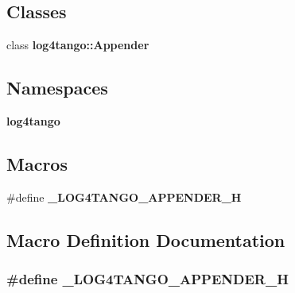 \subsection*{Classes}
\begin{DoxyCompactItemize}
\item 
class {\bf log4tango\-::\-Appender}
\end{DoxyCompactItemize}
\subsection*{Namespaces}
\begin{DoxyCompactItemize}
\item 
{\bf log4tango}
\end{DoxyCompactItemize}
\subsection*{Macros}
\begin{DoxyCompactItemize}
\item 
\#define {\bf \-\_\-\-L\-O\-G4\-T\-A\-N\-G\-O\-\_\-\-A\-P\-P\-E\-N\-D\-E\-R\-\_\-\-H}
\end{DoxyCompactItemize}


\subsection{Macro Definition Documentation}
\subsubsection[{\-\_\-\-L\-O\-G4\-T\-A\-N\-G\-O\-\_\-\-A\-P\-P\-E\-N\-D\-E\-R\-\_\-\-H}]{\setlength{\rightskip}{0pt plus 5cm}\#define \-\_\-\-L\-O\-G4\-T\-A\-N\-G\-O\-\_\-\-A\-P\-P\-E\-N\-D\-E\-R\-\_\-\-H}\label{Appender_8hh_abb0662b2282983a6a78a80220a3afc4b}
